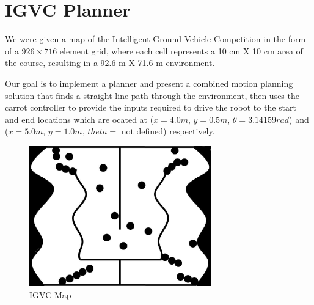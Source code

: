 \documentclass{article}
\begin{document}
\newpage
\section{IGVC Planner}
\label{sec:igvc_planner}
We were given a map of the Intelligent Ground Vehicle Competition in the form of a $926 \times 716$ element grid, where each cell
represents a 10 cm X 10 cm area of the course, resulting in a 92.6 m X 71.6 m environment. 

Our goal is to implement a planner and present a combined motion planning solution that finds a straight-line path through the environment, then uses the carrot controller to provide the inputs required to drive the robot to the start and end locations which are ocated at ($x = 4.0m$, $y = 0.5m$, $\theta = 3.14159 rad$) and ($x = 5.0 m$, $y = 1.0 m$, $theta =$ not defined) respectively. 


\begin{figure}[H]
	\centering
	\includegraphics[width=0.7\textwidth]{images/IGVCmap.jpg}
	\caption{IGVC Map}
	\label{fig:igvc_map}
\end{figure}



\newpage
\end{document}
